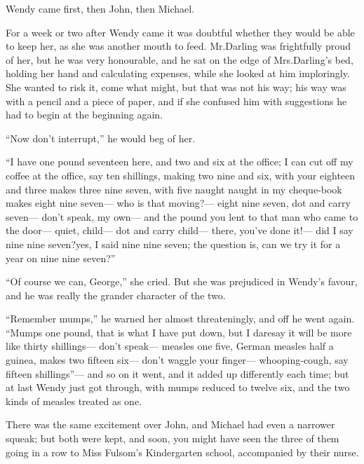 Wendy came first, then John, then Michael.

For a week or two after Wendy came it was doubtful whether they would be able to keep her,
as she was another mouth to feed.
Mr.\@ Darling was frightfully proud of her, but he was very honourable,
and he sat on the edge of Mrs.\@ Darling’s bed, holding her hand and calculating expenses,
while she looked at him imploringly.
She wanted to risk it, come what might, but that was not his way;
his way was with a pencil and a piece of paper,
and if she confused him with suggestions he had to begin at the beginning again.

“Now don’t interrupt,” he would beg of her.

“I have one pound seventeen here, and two and six at the office;
I can cut off my coffee at the office, say ten shillings, making two nine and six,
with your eighteen and three makes three nine seven,
with five naught naught in my cheque‐book makes eight nine seven—%
who is that moving?—%
eight nine seven, dot and carry seven—%
don’t speak, my own—%
and the pound you lent to that man who came to the door—%
quiet, child—%
dot and carry child—%
there, you’ve done it!—%
did I say nine nine seven?\@ yes, I said nine nine seven;
the question is, can we try it for a year on nine nine seven?”

“Of course we can, George,” she cried.
But she was prejudiced in Wendy’s favour, and he was really the grander character of the two.

“Remember mumps,” he warned her almost threateningly, and off he went again.
“Mumps one pound, that is what I have put down,
but I daresay it will be more like thirty shillings—%
don’t speak—%
measles one five, German measles half a guinea, makes two fifteen six—%
don’t waggle your finger—%
whooping‐cough, say fifteen shillings”—%
and so on it went, and it added up differently each time;
but at last Wendy just got through,
with mumps reduced to twelve six, and the two kinds of measles treated as one.

There was the same excitement over John,
and Michael had even a narrower squeak;
but both were kept,
and soon, you might have seen the three of them going in a row to Miss Fulsom’s Kindergarten school,
accompanied by their nurse.

